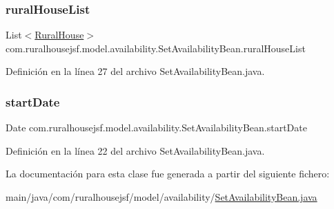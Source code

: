 \subsubsection{\texorpdfstring{ruralHouseList}{ruralHouseList}}
{\footnotesize\ttfamily List$<$\mbox{\hyperlink{classcom_1_1ruralhousejsf_1_1domain_1_1_rural_house}{Rural\+House}}$>$ com.\+ruralhousejsf.\+model.\+availability.\+Set\+Availability\+Bean.\+rural\+House\+List\hspace{0.3cm}{\ttfamily [private]}}



Definición en la línea 27 del archivo Set\+Availability\+Bean.\+java.

\mbox{\label{classcom_1_1ruralhousejsf_1_1model_1_1availability_1_1_set_availability_bean_a6962c301508cdd26f40a28468d59009c}} 
\subsubsection{\texorpdfstring{startDate}{startDate}}
{\footnotesize\ttfamily Date com.\+ruralhousejsf.\+model.\+availability.\+Set\+Availability\+Bean.\+start\+Date\hspace{0.3cm}{\ttfamily [private]}}



Definición en la línea 22 del archivo Set\+Availability\+Bean.\+java.



La documentación para esta clase fue generada a partir del siguiente fichero\+:\begin{DoxyCompactItemize}
\item 
main/java/com/ruralhousejsf/model/availability/\mbox{\hyperlink{_set_availability_bean_8java}{Set\+Availability\+Bean.\+java}}\end{DoxyCompactItemize}
